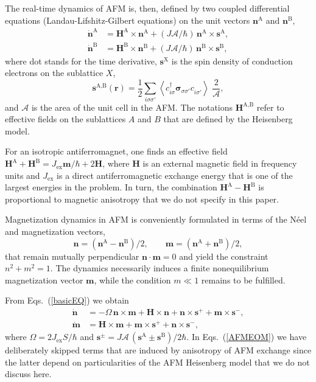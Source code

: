 \documentclass[%
  twocolumn,
  aps,
  prb,
  amsmath,
  amssymb,
  superscriptaddress,
  nofootinbib,
  floatfix
]{revtex4-1}
\newcommand{\s}{\sum\limits}
\newcommand{\be}{\begin{equation}}
\newcommand{\e}{\end{equation}}
\newcommand{\beml}{\begin{subequations}}
\newcommand{\eml}{\end{subequations}}
\newcommand{\lt}{\left}
\newcommand{\rt}{\right}
\newcommand{\la}{\langle}
\newcommand{\ra}{\rangle}
\newcommand{\bb}{\boldsymbol}
\newcommand{\h}{^\dagger}
\newcommand{\0}{^{\phantom{\dagger}}}
\begin{document}
The real-time dynamics of AFM is, then, defined by two coupled differential equations (Landau-Lifshitz-Gilbert equations) on the unit vectors $\bb{n}^\textrm{A}$ and $\bb{n}^\textrm{B}$, 
\beml
\label{basicEQ}
\begin{align}
\dot{\bb{n}}^\textrm{A} &= \bb{H}^\textrm{A}\times\bb{n}^\textrm{A}  + (J\mathcal{A}/\hbar)\,\bb{n}^\textrm{A}\times \bb{s}^\textrm{A},\\
\dot{\bb{n}}^\textrm{B}&= \bb{H}^\textrm{B}\times\bb{n}^\textrm{B} +(J\mathcal{A}/\hbar)\,\bb{n}^\textrm{B}\times \bb{s}^\textrm{B},
\end{align}
\eml
where dot stands for the time derivative, $\bb{s}^\textrm{X}$ is the spin density of conduction electrons on the sublattice $X$,
\be
\bb{s}^\textrm{A,B}(\bb{r})= \frac{1}{2} \s_{i\sigma\sigma'} \lt\la c\h_{i\sigma}\bb{\sigma}_{\sigma\sigma'} c\0_{i\sigma'} \rt\ra\;\frac{2}{\mathcal{A}},
\e
and $\mathcal{A}$ is the area of the unit cell in the AFM. The notations $\bb{H}^\textrm{A,B}$ refer to effective fields on the sublattices $A$ and $B$ that are defined by the Heisenberg model. 

For an isotropic antiferromagnet, one finds an effective field \cite{Gomonay2014} $\bb{H}^\textrm{A}+\bb{H}^\textrm{B}= J_\textrm{ex}\bb{m}/\hbar+2\bb{H}$, where $\bb{H}$ is an external magnetic field in frequency units and $J_\textrm{ex}$ is a direct antiferromagnetic exchange energy that is one of the largest energies in the problem. In turn, the combination $\bb{H}^\textrm{A}-\bb{H}^\textrm{B}$ is proportional to magnetic anisotropy that we do not specify in this paper.  

Magnetization dynamics in AFM is conveniently formulated in terms of the N\'eel and magnetization vectors,
\be
\bb{n}=\lt(\bb{n}^\textrm{A}-\bb{n}^\textrm{B}\rt)/2,\qquad \bb{m}= \lt(\bb{n}^\textrm{A}+\bb{n}^\textrm{B}\rt)/2,
\e
that remain mutually perpendicular $\bb{n}\cdot \bb{m}=0$ and yield the constraint $n^2+m^2=1$. The dynamics necessarily induces a finite nonequilibrium magnetization vector $\bb{m}$, while the condition $m\ll 1$ remains to be fulfilled.  

From Eqs.~(\ref{basicEQ}) we obtain
\beml
\label{AFMEOM}
\begin{align}
\label{ndot}
\dot{\bb{n}} &= -\Omega\, \bb{n}\times\bb{m} +\bb{H}\times\bb{n}+\bb{n}\times\bb{s}^++\bb{m}\times\bb{s}^-,\\
\label{mdot}
\dot{\bb{m}} &= \bb{H}\times\bb{m}+\bb{m}\times\bb{s}^++\bb{n}\times\bb{s}^-,
\end{align}
\eml
where $\Omega=2J_\textrm{ex}S/\hbar$ and $\bb{s}^{\pm}= J \mathcal{A}\,(\bb{s}^\textrm{A}\pm\bb{s}^\textrm{B})/2\hbar$. In Eqs.~(\ref{AFMEOM}) we have deliberately skipped terms that are induced by anisotropy of AFM exchange since the latter depend on particularities of the AFM Heisenberg model that we do not discuss here.  
\end{document}
